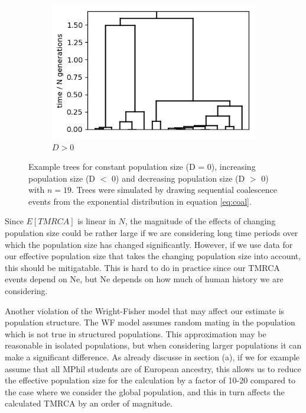 \documentclass{article}
\begin{document}
\begin{figure}[h]
\begin{subfigure}[t]{0.305\linewidth}
		\includegraphics[width = 1.0\linewidth, trim={0 0 0 0}, clip=true]{figures/drawtree_decreasing.png}
		\caption{$ D > 0$}
	\end{subfigure}
\caption{Example trees for constant population size (D = 0), increasing population size (D $<$ 0) and decreasing population size (D $>$ 0) with $n=19$. Trees were simulated by drawing sequential coalescence events from the exponential distribution in equation \ref{eq:coal}.}
\label{fig:changing_pop}
\end{figure}

Since $E[TMRCA]$ is linear in $N$, the magnitude of the effects of changing population size could be rather large if we are considering long time periods over which the population size has changed significantly. However, if we use data for our effective population size that takes the changing population size into account, this should be mitigatable. This is hard to do in practice since our TMRCA events depend on Ne, but Ne depends on how much of human history we are considering.

Another violation of the Wright-Fisher model that may affect our estimate is population structure. The WF model assumes random mating in the population which is not true in structured populations. This approximation may be reasonable in isolated populations, but when considering larger populations it can make a significant difference. As already discusse in section (a), if we for example assume that all MPhil students are of European ancestry, this allows us to reduce the effective population size for the calculation by a factor of 10-20 compared to the case where we consider the global population, and this in turn affects the calculated TMRCA by an order of magnitude.
\end{document}
